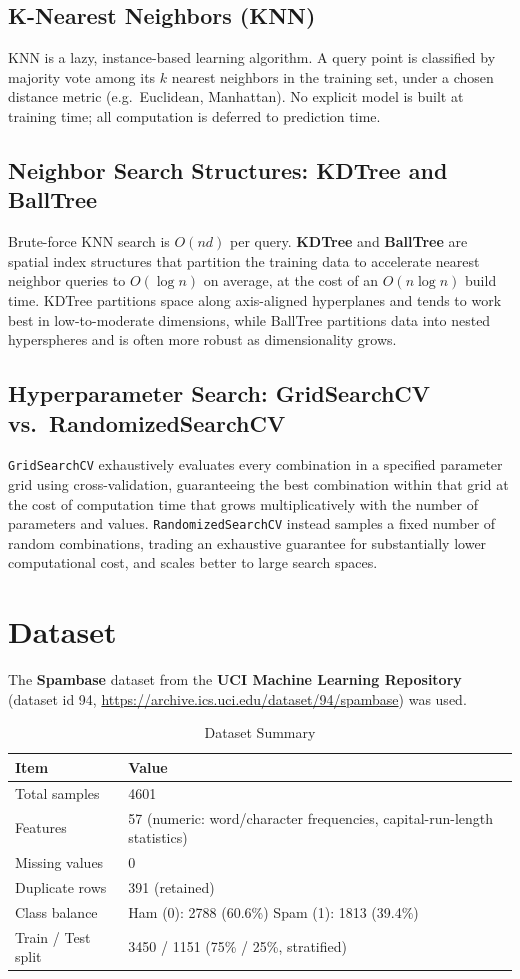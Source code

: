 \documentclass[11pt]{article}
\begin{document}
\subsection{K-Nearest Neighbors (KNN)}
KNN is a lazy, instance-based learning algorithm. A query point is classified by
majority vote among its $k$ nearest neighbors in the training set, under a chosen
distance metric (e.g.\ Euclidean, Manhattan). No explicit model is built at training
time; all computation is deferred to prediction time.

\subsection{Neighbor Search Structures: KDTree and BallTree}
Brute-force KNN search is $O(nd)$ per query. \textbf{KDTree} and \textbf{BallTree}
are spatial index structures that partition the training data to accelerate nearest
neighbor queries to $O(\log n)$ on average, at the cost of an $O(n \log n)$ build time.
KDTree partitions space along axis-aligned hyperplanes and tends to work best in
low-to-moderate dimensions, while BallTree partitions data into nested hyperspheres
and is often more robust as dimensionality grows.

\subsection{Hyperparameter Search: GridSearchCV vs.\ RandomizedSearchCV}
\texttt{GridSearchCV} exhaustively evaluates every combination in a specified
parameter grid using cross-validation, guaranteeing the best combination within that
grid at the cost of computation time that grows multiplicatively with the number of
parameters and values. \texttt{RandomizedSearchCV} instead samples a fixed number of
random combinations, trading an exhaustive guarantee for substantially lower
computational cost, and scales better to large search spaces.

\section{Dataset}
The \textbf{Spambase} dataset from the \textbf{UCI Machine Learning Repository}
(dataset id 94, \url{https://archive.ics.uci.edu/dataset/94/spambase}) was used.

\begin{table}[H]
\centering
\caption{Dataset Summary}
\begin{tabular}{ll}
\toprule
\textbf{Item} & \textbf{Value} \\
\midrule
Total samples & 4601 \\
Features & 57 (numeric: word/character frequencies, capital-run-length statistics) \\
Missing values & 0 \\
Duplicate rows & 391 (retained) \\
Class balance & Ham (0): 2788 (60.6\%) \quad Spam (1): 1813 (39.4\%) \\
Train / Test split & 3450 / 1151 (75\% / 25\%, stratified) \\
\bottomrule
\end{tabular}
\end{table}
\end{document}
